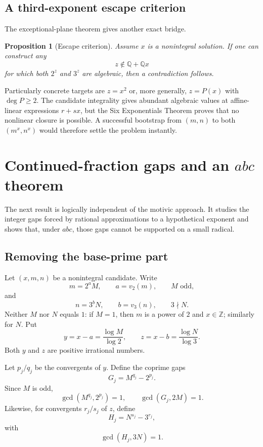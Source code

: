 \documentclass[11pt,oneside]{article}
\newtheorem{proposition}[theorem]{Proposition}
\theoremstyle{definition}
\newcommand{\Z}{\mathbb Z}
\newcommand{\Q}{\mathbb Q}
\begin{document}
\subsection{A third-exponent escape criterion}

The exceptional-plane theorem gives another exact bridge.

\begin{proposition}[Escape criterion]
Assume $x$ is a nonintegral solution.  If one can construct any
\[
  z\notin\Q+\Q x
\]
for which both $2^z$ and $3^z$ are algebraic, then a contradiction follows.
\end{proposition}

Particularly concrete targets are $z=x^2$ or, more generally, $z=P(x)$ with $\deg P\ge2$.  The candidate integrality gives abundant algebraic values at affine-linear expressions $r+sx$, but the Six Exponentials Theorem proves that no nonlinear closure is possible.  A successful bootstrap from $(m,n)$ to both $(m^x,n^x)$ would therefore settle the problem instantly.

\section{Continued-fraction gaps and an $abc$ theorem}

The next result is logically independent of the motivic approach.  It studies the integer gaps forced by rational approximations to a hypothetical exponent and shows that, under $abc$, those gaps cannot be supported on a small radical.

\subsection{Removing the base-prime part}

Let $(x,m,n)$ be a nonintegral candidate.  Write
\[
  m=2^aM,
  \qquad a=v_2(m),
  \qquad M\text{ odd},
\]
and
\[
  n=3^bN,
  \qquad b=v_3(n),
  \qquad 3\nmid N.
\]
Neither $M$ nor $N$ equals $1$: if $M=1$, then $m$ is a power of $2$ and $x\in\Z$; similarly for $N$.  Put
\[
  y=x-a=\frac{\log M}{\log2},
  \qquad
  z=x-b=\frac{\log N}{\log3}.
\]
Both $y$ and $z$ are positive irrational numbers.

Let $p_j/q_j$ be the convergents of $y$.  Define the coprime gaps
\begin{equation}\label{eq:Gj}
  G_j=M^{q_j}-2^{p_j}.
\end{equation}
Since $M$ is odd,
\[
  \gcd(M^{q_j},2^{p_j})=1,
  \qquad
  \gcd(G_j,2M)=1.
\]
Likewise, for convergents $r_j/s_j$ of $z$, define
\begin{equation}\label{eq:Hj}
  H_j=N^{s_j}-3^{r_j},
\end{equation}
with
\[
  \gcd(H_j,3N)=1.
\]
\end{document}
